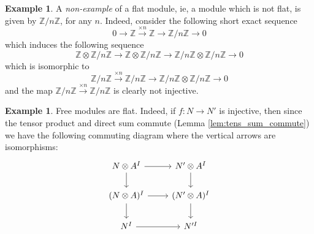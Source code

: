 \documentclass[12pt]{article}
\theoremstyle{plain}
\theoremstyle{definition}
\newtheorem{example}[thm]{Example}
\newcommand{\bb}[1]{\mathbb{#1}}
\newcommand{\lto}{\longrightarrow}
\begin{document}
\begin{example}
A \emph{non-example} of a flat module, ie, a module which is not flat, is given by $\bb{Z}/n\bb{Z}$, for any $n$. Indeed, consider the following short exact sequence
\begin{equation}
0 \lto \bb{Z} \stackrel{\times n}{\lto}\bb{Z} \lto \bb{Z}/n\bb{Z} \lto 0
\end{equation}
which induces the following sequence
\begin{equation}
\bb{Z} \otimes \bb{Z}/n\bb{Z} \lto \bb{Z} \otimes \bb{Z}/n\bb{Z} \lto \bb{Z}/n\bb{Z} \otimes \bb{Z}/n\bb{Z} \lto 0
\end{equation}
which is isomorphic to
\begin{equation}
\bb{Z}/n\bb{Z} \stackrel{\times n}{\lto} \bb{Z}/n\bb{Z} \lto \bb{Z}/n\bb{Z} \otimes \bb{Z}/n\bb{Z} \lto 0
\end{equation}
and the map $\bb{Z}/n\bb{Z} \stackrel{\times n}{\lto} \bb{Z}/n\bb{Z}$ is clearly not injective.
\end{example}
\begin{example}
Free modules are flat. Indeed, if $f: N \lto N'$ is injective, then since the tensor product and direct sum commute (Lemma \ref{lem:tens_sum_commute}) we have the following commuting diagram where the vertical arrows are isomorphisms:
\begin{equation}
\begin{tikzcd}
N \otimes A^I\arrow[r]\arrow[d] & N' \otimes A^I\arrow[d]\\
(N \otimes A)^I\arrow[d]\arrow[r] & (N' \otimes A)^I\arrow[d]\\
N^I\arrow[r] & N'^I
\end{tikzcd}
\end{equation}
\end{example}
\end{document}
